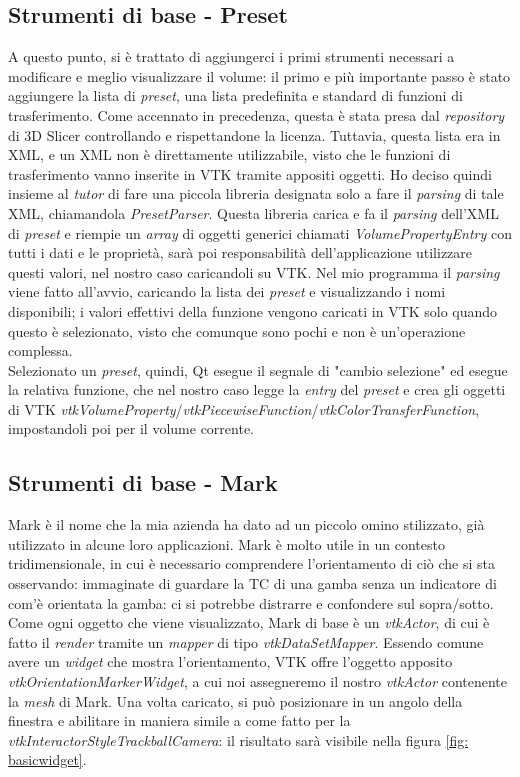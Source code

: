 \subsection{Strumenti di base - Preset}
A questo punto, si è trattato di aggiungerci i primi strumenti necessari a modificare e meglio visualizzare il volume: il primo e più importante passo è stato aggiungere la lista di \emph{preset}, una lista predefinita e standard di funzioni di trasferimento. Come accennato in precedenza, questa è stata presa dal \emph{repository} di 3D Slicer controllando e rispettandone la licenza. Tuttavia, questa lista era in XML, e un XML non è direttamente utilizzabile, visto che le funzioni di trasferimento vanno inserite in VTK tramite appositi oggetti. Ho deciso quindi insieme al \emph{tutor} di fare una piccola libreria designata solo a fare il \emph{parsing} di tale XML, chiamandola \emph{PresetParser}. Questa libreria carica e fa il \emph{parsing} dell'XML di \emph{preset} e riempie un \emph{array} di oggetti generici chiamati \emph{VolumePropertyEntry} con tutti i dati e le proprietà, sarà poi responsabilità dell'applicazione utilizzare questi valori, nel nostro caso caricandoli su VTK. Nel mio programma il \emph{parsing} viene fatto all'avvio, caricando la lista dei \emph{preset} e visualizzando i nomi disponibili; i valori effettivi della funzione vengono caricati in VTK solo quando questo è selezionato, visto che comunque sono pochi e non è un'operazione complessa.
\\
Selezionato un \emph{preset}, quindi, Qt esegue il segnale di "cambio selezione" ed esegue la relativa funzione, che nel nostro caso legge la \emph{entry} del \emph{preset} e crea gli oggetti di VTK \emph{vtkVolumeProperty}/\emph{vtkPiecewiseFunction}/\emph{vtkColorTransferFunction}, impostandoli poi per il volume corrente.

\subsection{Strumenti di base - Mark}
Mark è il nome che la mia azienda ha dato ad un piccolo omino stilizzato, già utilizzato in alcune loro applicazioni. Mark è molto utile in un contesto tridimensionale, in cui è necessario comprendere l'orientamento di ciò che si sta osservando: immaginate di guardare la TC di una gamba senza un indicatore di com'è orientata la gamba: ci si potrebbe distrarre e confondere sul sopra/sotto. Come ogni oggetto che viene visualizzato, Mark di base è un \emph{vtkActor}, di cui è fatto il \emph{render} tramite un \emph{mapper} di tipo \emph{vtkDataSetMapper}. Essendo comune avere un \emph{widget} che mostra l'orientamento, VTK offre l'oggetto apposito \emph{vtkOrientationMarkerWidget}, a cui noi assegneremo il nostro \emph{vtkActor} contenente la \emph{mesh} di Mark. Una volta caricato, si può posizionare in un angolo della finestra e abilitare in maniera simile a come fatto per la \emph{vtkInteractorStyleTrackballCamera}: il risultato sarà visibile nella figura \ref{fig: basicwidget}.

